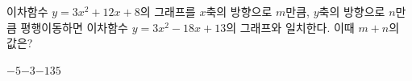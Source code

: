 이차함수 $y=3x^2+12x+8$의 그래프를 $x$축의 방향으로 $m$만큼, $y$축의 방향으로 $n$만큼 평행이동하면 이차함수 $y=3x^2-18x+13$의 그래프와 일치한다. 이때 $m+n$의 값은?
\begin{choices32}{$-5$}{$-3$}{$-1$}{$3$}{$5$}\end{choices32}
